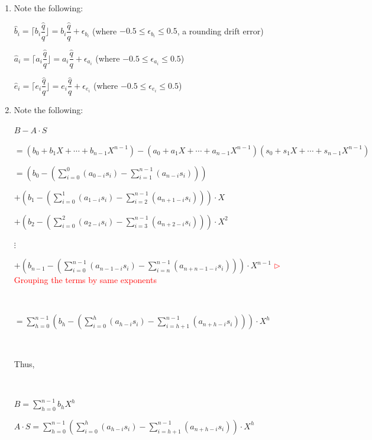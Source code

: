 \begin{enumerate}
\item Note the following: 

$\hat{b}_i = \Big\lceil b_i \dfrac{\hat{q}}{q} \Big\rfloor = b_i\dfrac{\hat{q}}{q} + \epsilon_{b_i}$ (where $-0.5 \le \epsilon_{b_i} \le 0.5$, a rounding drift error)

$\hat{a}_i = \Big\lceil a_i \dfrac{\hat{q}}{q} \Big\rfloor = a_i\dfrac{\hat{q}}{q} + \epsilon_{a_i}$ (where $-0.5 \le \epsilon_{a_i} \le 0.5$)

$\hat{e}_i = \Big\lceil e_i \dfrac{\hat{q}}{q} \Big\rfloor = e_i\dfrac{\hat{q}}{q} + \epsilon_{e_i}$ (where $-0.5 \le \epsilon_{e_i} \le 0.5$)

\item Note the following: 


$B - A\cdot S$ 

$ = (b_0 + b_1X + \cdots + b_{n-1}X^{n-1} ) - (a_{0} + a_{1}X + \cdots + a_{n-1}X^{n-1})(s_{0} + s_{1}X + \cdots + s_{n-1}X^{n-1})$ 


$ = \left(b_0 - \left( \sum\limits_{i=0}^{0}(a_{0-i}s_{i}) - \sum\limits_{i=1}^{n-1}(a_{n-i}s_{i}) \right)\right)$

$ + \left(b_1 - \left( \sum\limits_{i=0}^{1}(a_{1-i}s_{i}) - \sum\limits_{i=2}^{n-1}(a_{n+1-i}s_{i})   \right) \right)\cdot X$ 



$ + \left(b_2 - \left( \sum\limits_{i=0}^{2}(a_{2-i}s_{i}) - \sum\limits_{i=3}^{n-1}(a_{n+2-i}s_{i})   \right) \right)\cdot X^2$ 


$\vdots$ 


$ + \left(b_{n-1} - \left(  \sum\limits_{i=0}^{n-1}(a_{n-1-i}s_{i}) -  \sum\limits_{i=n}^{n-1}(a_{n+n-1-i}s_{i})  \right) \right)\cdot X^{n-1}$ \textcolor{red}{ $\rhd$ Grouping the terms by same exponents}

$ $

$= \sum\limits_{h=0}^{n-1}  \left(b_h - \left( \sum\limits_{i=0}^{h}(a_{h-i}s_{i}) -  \sum\limits_{i=h+1}^{n-1}(a_{n+h-i}s_{i})  \right) \right)\cdot X^{h}  $

$ $

Thus,

$ $

$B = \sum\limits_{h=0}^{n-1}  b_h  X^{h}  $

$A\cdot S = \sum\limits_{h=0}^{n-1}  \left(\sum\limits_{i=0}^{h}(a_{h-i}s_{i}) - \sum\limits_{i=h+1}^{n-1}(a_{n+h-i}s_{i}) \right)\cdot X^{h}  $



\end{enumerate}
